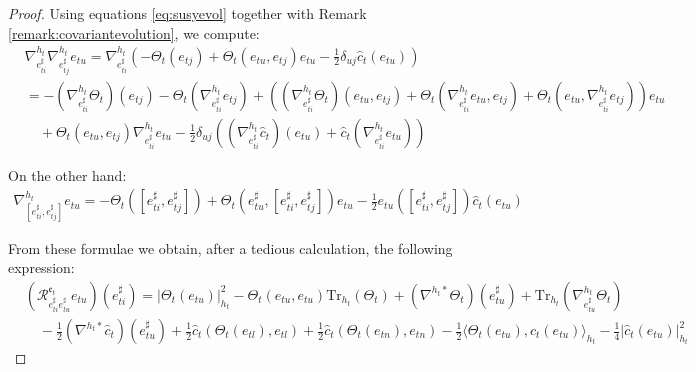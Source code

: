 \documentclass[10pt,reqno,a4paper]{amsart}
\theoremstyle{plain}
\theoremstyle{definition}
\theoremstyle{remark}
\theoremstyle{remark}
\newcommand{\Tr}{\mathrm{Tr}}
\def\cR{{\mathcal R}}
\def\fre{\mathfrak{e}}
\renewcommand{\(}{ (}
\renewcommand{\)}{ )}
\begin{document}
\begin{proof}
Using equations \eqref{eq:susyevol} together with Remark \ref{remark:covariantevolution}, we compute:
\begin{eqnarray*}
&\nabla^{h_t}_{e^{\sharp}_{ti}}\nabla^{h_t}_{e_{tj}^{\sharp}}e_{tu}=\nabla^{h_t}_{e^{\sharp}_{ti}}(-\Theta_t(e_{tj})+\Theta_t(e_{tu},e_{tj})e_{tu}-\frac{1}{2}\delta_{uj}\widehat{c}_t (e_{tu}))\\
&=-(\nabla^{h_t}_{e^{\sharp}_{ti}}\Theta_t)(e_{tj})-\Theta_t(\nabla^{h_t}_{e^{\sharp}_{ti}}e_{tj})+((\nabla^{h_t}_{e^{\sharp}_{ti}}\Theta_t)(e_{tu},e_{tj})+\Theta_t(\nabla^{h_t}_{e^{\sharp}_{ti}}e_{tu},e_{tj})+\Theta_t(e_{tu},\nabla^{h_t}_{e^{\sharp}_{ti}}e_{tj}))e_{tu}\\
&\quad+\Theta_t(e_{tu},e_{tj})\nabla^{h_t}_{e^{\sharp}_{ti}}e_{tu}-\frac{1}{2}\delta_{uj}((\nabla^{h_t}_{e^{\sharp}_{ti}}\widehat{c}_t )(e_{tu})+\widehat{c}_t (\nabla^{h_t}_{e^{\sharp}_{ti}}e_{tu}))
\end{eqnarray*}

\noindent
On the other hand:
\begin{eqnarray*}
\nabla^{h_t}_{[e^{\sharp}_{ti},e_{tj}^{\sharp}]}e_{tu}=-\Theta_t([e^{\sharp}_{ti},e_{tj}^{\sharp}])+\Theta_t(e^{\sharp}_{tu},[e^{\sharp}_{ti},e_{tj}^{\sharp}])e_{tu}-\frac{1}{2}e_{tu}([e^{\sharp}_{ti},e_{tj}^{\sharp}])\widehat{c}_t (e_{tu})
\end{eqnarray*}

\noindent
From these formulae we obtain, after a tedious calculation, the following expression:
\begin{eqnarray*}
& (\cR^{\fre_t}_{e^{\sharp}_{ti} e^{\sharp}_{tu}}e_{tu})(e^{\sharp}_{ti})=\vert\Theta_t(e_{tu})\vert^2_{h_t}-\Theta_t(e_{tu},e_{tu})\Tr_{h_t}(\Theta_t)+(\nabla^{h_t\ast}\Theta_t)(e^{\sharp}_{tu})+\Tr_{h_t}(\nabla^{h_t}_{e^{\sharp}_{tu}}\Theta_t)\\
&\quad-\frac{1}{2}(\nabla^{h_t\ast}\widehat{c}_t )(e^{\sharp}_{tu})+\frac{1}{2}\widehat{c}_t (\Theta_t(e_{tl}),e_{tl})+\frac{1}{2}\widehat{c}_t (\Theta_t(e_{tn}),e_{tn})-\frac{1}{2}\langle\Theta_t(e_{tu}),\widehat{c}_t (e_{tu})\rangle_{h_t}-\frac{1}{4}\vert\widehat{c}_t (e_{tu})\vert_{h_t}^2
\end{eqnarray*}


\end{proof}
\end{document}
